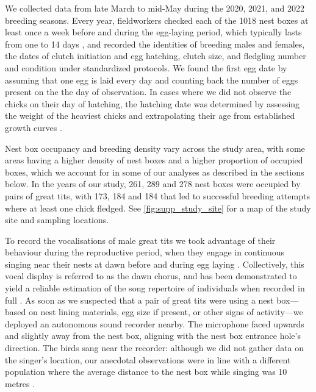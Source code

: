 \documentclass[9pt, onecolumn, twoside, lineno]{gsajnl}
\begin{document}
We collected data from late March to mid-May during the 2020, 2021, and 2022 breeding seasons. Every year, fieldworkers checked each of the 1018 nest boxes at least once a week before and during the egg-laying period, which typically lasts from one to 14 days \autocite{Perrins1965}, and recorded the identities of breeding males and females, the dates of clutch initiation and egg hatching, clutch size, and fledgling number and condition under standardized protocols. We found the first egg date by assuming that one egg is laid every day and counting back the number of eggs present on the the day of observation. In cases where we did not observe the chicks on their day of hatching, the hatching date was determined by assessing the weight of the heaviest chicks and extrapolating their age from established growth curves \autocite{cresswell2003, gibb1950}.

Nest box occupancy and breeding density vary across the study area, with some areas having a higher density of nest boxes and a higher proportion of occupied boxes, which we account for in some of our analyses as described in the sections below. In the years of our study,  261, 289 and 278 nest boxes were occupied by pairs of great tits, with 173, 184 and 184 that led to successful breeding attempts where at least one chick fledged. See \autoref{fig:supp_study_site} for a map of the study site and sampling locations.

To record the vocalisations of male great tits we took advantage of their behaviour during the reproductive period, when they engage in continuous singing near their nests at dawn before and during egg laying \autocite{mace1987}. Collectively, this vocal display is referred to as the dawn chorus, and has been demonstrated to yield a reliable estimation of the song repertoire of individuals when recorded in full \autocite{rivera-gutierrez2012, vanduyse2005}. As soon as we suspected that a pair of great tits were using a nest box---based on nest lining materials, egg size if present, or other signs of activity---we deployed an autonomous sound recorder nearby. The microphone faced upwards and slightly away from the nest box, aligning with the nest box entrance hole's direction. The birds sang near the recorder: although we did not gather data on the singer's location, our anecdotal observations were in line with a different population where the average distance to the nest box while singing was 10 metres \autocite{halfwerk2012}. 
\end{document}
